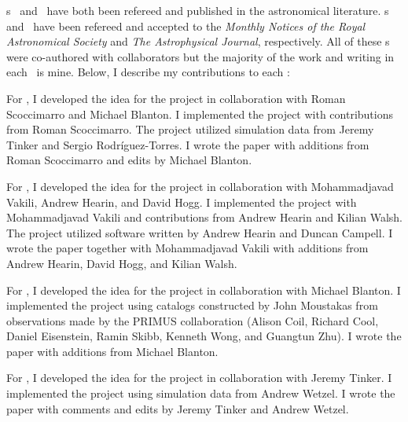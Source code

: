 \chapname s~ and~ have both been refereed and
published in the astronomical literature.
\chapname s~ and~ have been refereed and accepted 
to the \emph{Monthly Notices of the Royal Astronomical Society} and \emph{The Astrophysical Journal},
respectively. All of these \chapname s were co-authored with collaborators but the majority
of the work and writing in each \chapname\ is mine. Below, I describe my contributions to each \chapname:
\begin{enumerate}

{\item 
For , I developed the idea for the project in collaboration with Roman
Scoccimarro and Michael Blanton. I implemented the project with contributions 
from Roman Scoccimarro. The project utilized simulation data from Jeremy Tinker
and Sergio Rodr\'{i}guez-Torres. I wrote the paper with additions from 
Roman Scoccimarro and edits by Michael Blanton. 
}

{\item 
For , I developed the idea for the project in collaboration with 
Mohammadjavad Vakili, Andrew Hearin, and David Hogg. I implemented the project 
with Mohammadjavad Vakili and contributions from Andrew Hearin and Kilian Walsh.
The project utilized software written by Andrew Hearin and Duncan Campell. 
I wrote the paper together with Mohammadjavad Vakili with additions from
Andrew Hearin, David Hogg, and Kilian Walsh.
}

{\item 
For , I developed the idea for the project in collaboration with 
Michael Blanton. I implemented the project using catalogs constructed by 
John Moustakas from observations made by the PRIMUS collaboration (Alison Coil,
Richard Cool, Daniel Eisenstein, Ramin Skibb, Kenneth Wong, and Guangtun Zhu).
I wrote the paper with additions from Michael Blanton. 
}

{\item 
For , I developed the idea for the project in collaboration with 
Jeremy Tinker. I implemented the project using simulation data from Andrew 
Wetzel. I wrote the paper with comments and edits by Jeremy Tinker and Andrew 
Wetzel. 
}
\end{enumerate}
